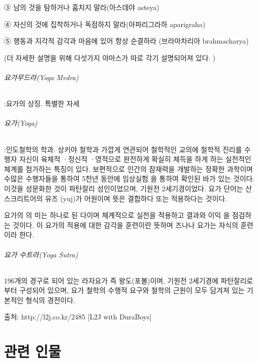 \documentclass[12pt, a4paper, oneside]{book}
\begin{document}
   ③ 남의 것을 탐하거나 훔치지 말라(아스데야 asteya)

   ④ 자신의 것에 집착하거나 독점하지 말라(아파리그라하 aparigraha)

   ⑤ 행동과 지각적 감각과 마음에 있어 항상 순결하라 (브라마차리아 brahmacharya) 

       (더 자세한 설명을 위해 다섯가지 야마스가 따로 각기 설명되어져 있다. )

\paragraph{요가무드라(Yoga Mvdra)} :요가의 상징. 특별한 자세

\paragraph{요가(Yoga)} :인도철학의 학과. 상키야 철학과 가깝게 연관되어 철학적인 교의에 철학적 진리를 수행자 자신이 육체적 ·정신적 ·영적으로 완전하게 확실히 체득을 하게 하는 실천적인 체계를 첨가하는 특징이 있다. 보편적으로 인간의 잠재력을 개발하는 정확한 과학이며 수많은 수행자들을 통하여 5천년 동안에 임상실험 을 통하여 확인된 바가 있는 것이다. 이것을 성문화한 것이 파탄잘리 성인이었으며, 기원전 2세기경이었다. 요가 단어는 산스크리트어의 유즈 (yuj)가 어원이며 뜻은 결합하다 또는 적용하다는 것이다.

요가의 의 미는 하나로 된 다이며 체계적으로 실천을 적용하고 결과와 이익 을 점검하는 것이다. 
이 요가의 적용에 대한 감각을 훈련이란 뜻하며 즈나나 요가는 자식의 훈련이라  한다.

\paragraph{요가 수트라(Yoga Sutra)}
196개의 경구로 되어 있는 라자요가 즉 왕도(포볼)이며, 기원전 2세기경에 파탄잘리로부터 구성되어 있으며, 요가 철학의 수행적 요구와 철학의 근원이 모두 담겨져 있는 기본적인 형식의 경전이다.



출처: http://l2j.co.kr/2485 [L2J with DuraBoys]



	\part{관련 인물}
	\noptcrule
	\parttoc				

\end{document}
